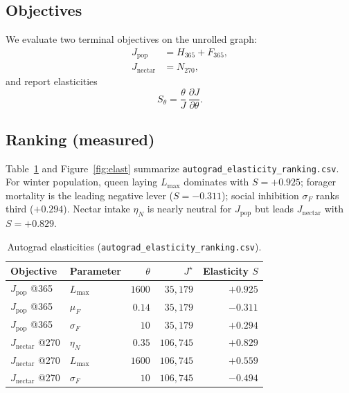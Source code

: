 \documentclass[12pt]{article}
\newcommand{\Lmax}{L_{\max}}
\newcommand{\muF}{\mu_{F}}
\newcommand{\etaN}{\eta_{N}}
\newcommand{\sigF}{\sigma_{F}}
\begin{document}
\subsection{Objectives}
We evaluate two terminal objectives on the unrolled graph:
\begin{align}
  J_{\mathrm{pop}} &= H_{365}+F_{365},\\
  J_{\mathrm{nectar}} &= N_{270},
\end{align}
and report elasticities
\begin{equation}
  S_\theta = \frac{\theta}{J}\,\frac{\partial J}{\partial\theta}.
\end{equation}

\subsection{Ranking (measured)}
Table~\ref{tab:elast} and Figure~\ref{fig:elast} summarize
\texttt{autograd\_elasticity\_ranking.csv}. For winter population, queen
laying \(\Lmax\) dominates with \(S=+0.925\); forager mortality is the
leading negative lever (\(S=-0.311\)); social inhibition \(\sigF\) ranks
third (\(+0.294\)). Nectar intake \(\etaN\) is nearly neutral for
\(J_{\mathrm{pop}}\) but leads \(J_{\mathrm{nectar}}\) with
\(S=+0.829\).

\begin{table}[htbp]
  \centering
  \caption{Autograd elasticities
  (\texttt{autograd\_elasticity\_ranking.csv}).}
  \label{tab:elast}
  \begin{tabular}{llrrr}
    \toprule
    Objective & Parameter & \(\theta\) & \(J^\star\) & Elasticity \(S\) \\
    \midrule
    \(J_{\mathrm{pop}}\) @365
      & \(\Lmax\) & \(1600\) & \(35{,}179\) & \(+0.925\) \\
    \(J_{\mathrm{pop}}\) @365
      & \(\muF\) & \(0.14\) & \(35{,}179\) & \(-0.311\) \\
    \(J_{\mathrm{pop}}\) @365
      & \(\sigF\) & \(10\) & \(35{,}179\) & \(+0.294\) \\
    \(J_{\mathrm{nectar}}\) @270
      & \(\etaN\) & \(0.35\) & \(106{,}745\) & \(+0.829\) \\
    \(J_{\mathrm{nectar}}\) @270
      & \(\Lmax\) & \(1600\) & \(106{,}745\) & \(+0.559\) \\
    \(J_{\mathrm{nectar}}\) @270
      & \(\sigF\) & \(10\) & \(106{,}745\) & \(-0.494\) \\
    \bottomrule
  \end{tabular}
\end{table}
\end{document}
